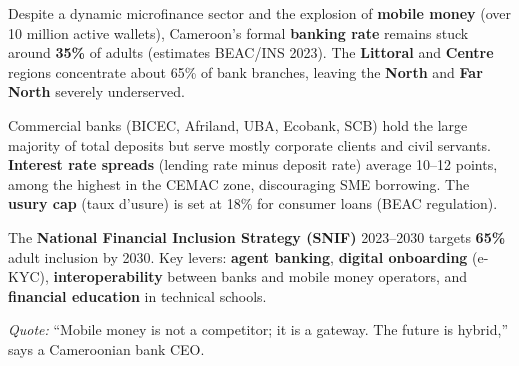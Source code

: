 \documentclass[11pt]{article}
\begin{document}
\begin{exemplebox}
Despite a dynamic microfinance sector and the explosion of \textbf{mobile money} (over \num{10} million active wallets), Cameroon's formal \textbf{banking rate} remains stuck around \textbf{35\%} of adults (estimates BEAC/INS 2023). The \textbf{Littoral} and \textbf{Centre} regions concentrate about \num{65}\% of bank branches, leaving the \textbf{North} and \textbf{Far North} severely underserved.

Commercial banks (BICEC, Afriland, UBA, Ecobank, SCB) hold the large majority of total deposits but serve mostly corporate clients and civil servants. \textbf{Interest rate spreads} (lending rate minus deposit rate) average \num{10}--\num{12} points, among the highest in the CEMAC zone, discouraging SME borrowing. The \textbf{usury cap} (taux d'usure) is set at \num{18}\% for consumer loans (BEAC regulation).

The \textbf{National Financial Inclusion Strategy (SNIF)} 2023--2030 targets \textbf{65\%} adult inclusion by 2030. Key levers: \textbf{agent banking}, \textbf{digital onboarding} (e-KYC), \textbf{interoperability} between banks and mobile money operators, and \textbf{financial education} in technical schools.

\textit{Quote:} ``Mobile money is not a competitor; it is a gateway. The future is hybrid,'' says a Cameroonian bank CEO.
\end{exemplebox}
\end{document}

